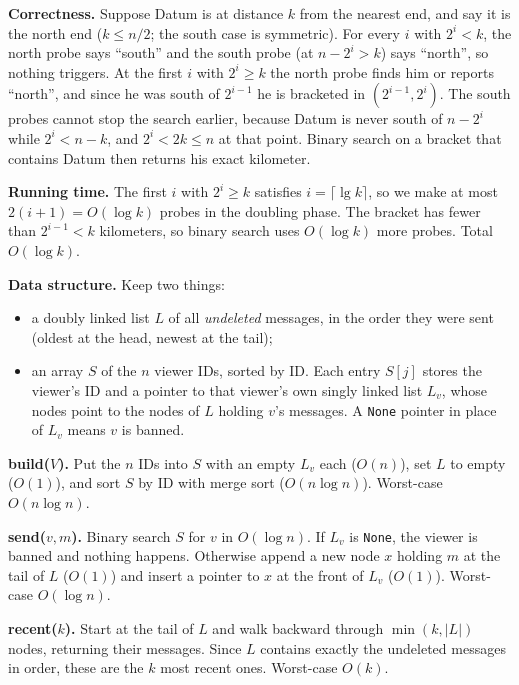 \documentclass[12pt,twoside]{article}
\begin{document}
\begin{problems}
\textbf{Correctness.} Suppose Datum is at distance $k$ from the nearest end, and say it is the north
end ($k\le n/2$; the south case is symmetric). For every $i$ with $2^i<k$, the north probe says
``south'' and the south probe (at $n-2^i > k$) says ``north'', so nothing triggers. At the first
$i$ with $2^i\ge k$ the north probe finds him or reports ``north'', and since he was south of
$2^{i-1}$ he is bracketed in $(2^{i-1},2^i)$. The south probes cannot stop the search earlier,
because Datum is never south of $n-2^{i}$ while $2^i<n-k$, and $2^i < 2k \le n$ at that point.
Binary search on a bracket that contains Datum then returns his exact kilometer.

\textbf{Running time.} The first $i$ with $2^i\ge k$ satisfies $i=\lceil\lg k\rceil$, so we make at
most $2(i+1)=O(\log k)$ probes in the doubling phase. The bracket has fewer than $2^{i-1}<k$
kilometers, so binary search uses $O(\log k)$ more probes. Total $O(\log k)$.

\newpage
\problem  %

\textbf{Data structure.} Keep two things:
\begin{itemize}
\item a doubly linked list $L$ of all \emph{undeleted} messages, in the order they were sent
(oldest at the head, newest at the tail);
\item an array $S$ of the $n$ viewer IDs, sorted by ID. Each entry $S[j]$ stores the viewer's ID
and a pointer to that viewer's own singly linked list $L_v$, whose nodes point to the nodes of $L$
holding $v$'s messages. A \texttt{None} pointer in place of $L_v$ means $v$ is banned.
\end{itemize}

\textbf{build($V$).} Put the $n$ IDs into $S$ with an empty $L_v$ each ($O(n)$), set $L$ to empty
($O(1)$), and sort $S$ by ID with merge sort ($O(n\log n)$). Worst-case $O(n\log n)$.

\textbf{send($v,m$).} Binary search $S$ for $v$ in $O(\log n)$. If $L_v$ is \texttt{None}, the
viewer is banned and nothing happens. Otherwise append a new node $x$ holding $m$ at the tail of
$L$ ($O(1)$) and insert a pointer to $x$ at the front of $L_v$ ($O(1)$). Worst-case $O(\log n)$.

\textbf{recent($k$).} Start at the tail of $L$ and walk backward through $\min(k,|L|)$ nodes,
returning their messages. Since $L$ contains exactly the undeleted messages in order, these are
the $k$ most recent ones. Worst-case $O(k)$.


\end{problems}
\end{document}
